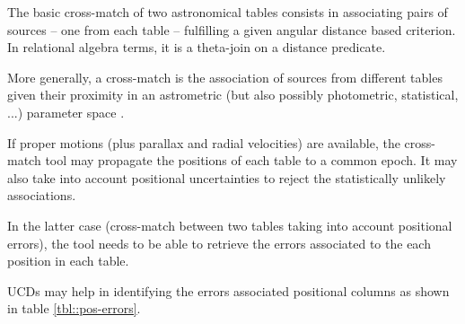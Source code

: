 The basic cross-match of two astronomical tables consists in associating pairs of sources -- one 
from each table -- fulfilling a given angular distance based criterion.
In relational algebra terms, it is a theta-join on a distance predicate.

More generally, a cross-match is the association of sources from different tables given their 
proximity in an astrometric (but also possibly photometric, statistical, ...) parameter space \citep{2017A&A...597A..89P} .

If proper motions (plus parallax and radial velocities) are available, the cross-match tool 
may propagate the positions of each table to a common epoch.
It may also take into account positional uncertainties to reject the statistically unlikely associations.

In the latter case (cross-match between two tables taking into account positional errors),
the tool needs to be able to retrieve the errors associated to the each position in each table.

UCDs may help in identifying the errors associated positional columns as shown in table \ref{tbl::pos-errors}.


